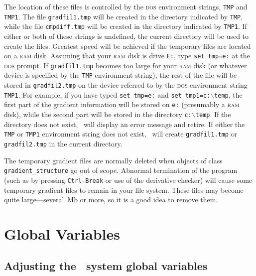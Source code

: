 \documentclass{admbmanual}
\newcommand\bs{$\backslash$}
\begin{document}
The location of these files is controlled by the \textsc{dos} environment
strings, \texttt{TMP} and \texttt{TMP1}. The file \texttt{gradfil1.tmp} will be
created in the directory indicated by \texttt{TMP}, while the file
\texttt{cmpdiff.tmp} will be created in the directory indicated by
\texttt{TMP1}. If either or both of these strings is undefined, the current
directory will be used to create the files. Greatest speed will be achieved if
the temporary files are located on a \textsc{ram} disk. Assuming that your
\textsc{ram} disk is drive \texttt{E:}, type \texttt{set tmp=e:} at the
\textsc{dos} prompt. If \texttt{gradfil1.tmp} becomes too large for your
\textsc{ram} disk (or whatever device is specified by the \texttt{TMP}
environment string), the rest of the file will be stored in
\texttt{gradfil2.tmp} on the device referred to by the \textsc{dos} environment
string \texttt{TMP1}. For example, if you have typed \texttt{set tmp=e:} and
\texttt{set tmp1=c:\bs temp}, the first part of the gradient information will be
stored on \texttt{e:} (presumably a \textsc{ram} disk), while the second part
will be stored in the directory \texttt{c:\bs temp}. If the directory does not
exist, \scAD\ will display an error message and retire. If either the
\texttt{TMP} or \texttt{TMP1} environment string does not exist, \scAD\ will
create \texttt{gradfil1.tmp} or \texttt{gradfil2.tmp} in the current directory.

The temporary gradient files are normally deleted when objects of class
\texttt{gradient\_structure} go out of scope. Abnormal termination of the
program (such as by pressing \texttt{Ctrl-Break} or use of the derivative
checker) will cause some temporary gradient files to remain in your file system.
These files may become quite large---several~Mb or more, so it is a good idea to
remove them.


\chapter{Global Variables}

\section{Adjusting the \scAD\ system global variables}
\end{document}
